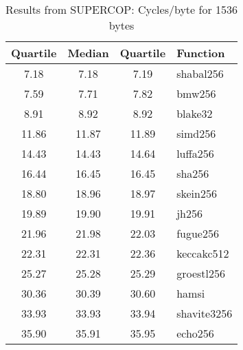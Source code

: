 \begin{table}
  \centering
  \caption{Results from SUPERCOP: Cycles/byte for 1536 bytes}
  \begin{tabular}{ | c | c | c | l | }
    \hline
    \textbf{Quartile} & \textbf{Median} & \textbf{Quartile} & \textbf{Function} \\ \hline
    7.18 & 7.18 & 7.19 & shabal256 \\ \hline
    7.59 & 7.71 & 7.82 & bmw256 \\ \hline
    8.91 & 8.92 & 8.92 & blake32 \\ \hline
    11.86 & 11.87 & 11.89 & simd256 \\ \hline
    14.43 & 14.43 & 14.64 & luffa256 \\ \hline
    16.44 & 16.45 & 16.45 & sha256 \\ \hline
    18.80 & 18.96 & 18.97 & skein256 \\ \hline
    19.89 & 19.90 & 19.91 & jh256 \\ \hline
    21.96 & 21.98 & 22.03 & fugue256 \\ \hline
    22.31 & 22.31 & 22.36 & keccakc512 \\ \hline
    25.27 & 25.28 & 25.29 & groestl256 \\ \hline
    30.36 & 30.39 & 30.60 & hamsi \\ \hline
    33.93 & 33.93 & 33.94 & shavite3256 \\ \hline
    35.90 & 35.91 & 35.95 & echo256 \\ \hline
  \end{tabular}
  \label{tbl:supercop:1536}
\end{table}

